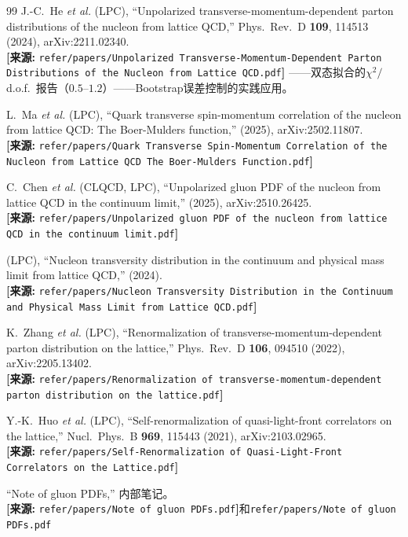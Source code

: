 \documentclass[12pt,a4paper]{ctexart}
\theoremstyle{definition}
\begin{document}
\begin{thebibliography}{99}
J.-C.~He \textit{et al.} (LPC),
``Unpolarized transverse-momentum-dependent parton distributions of the nucleon from lattice QCD,''
Phys.\ Rev.\ D \textbf{109}, 114513 (2024), arXiv:2211.02340.
\\\textbf{[来源:} \texttt{refer/papers/Unpolarized Transverse-Momentum-Dependent Parton Distributions of the Nucleon from Lattice QCD.pdf}\textbf{]}
——双态拟合的$\chi^2/$d.o.f.\ 报告（$0.5\text{--}1.2$）——Bootstrap误差控制的实践应用。

L.~Ma \textit{et al.} (LPC),
``Quark transverse spin-momentum correlation of the nucleon from lattice QCD: The Boer-Mulders function,''
(2025), arXiv:2502.11807.
\\\textbf{[来源:} \texttt{refer/papers/Quark Transverse Spin-Momentum Correlation of the Nucleon from Lattice QCD The Boer-Mulders Function.pdf}\textbf{]}

C.~Chen \textit{et al.} (CLQCD, LPC),
``Unpolarized gluon PDF of the nucleon from lattice QCD in the continuum limit,''
(2025), arXiv:2510.26425.
\\\textbf{[来源:} \texttt{refer/papers/Unpolarized gluon PDF of the nucleon from lattice QCD in the continuum limit.pdf}\textbf{]}

(LPC),
``Nucleon transversity distribution in the continuum and physical mass limit from lattice QCD,''
(2024).
\\\textbf{[来源:} \texttt{refer/papers/Nucleon Transversity Distribution in the Continuum and Physical Mass Limit from Lattice QCD.pdf}\textbf{]}

K.~Zhang \textit{et al.} (LPC),
``Renormalization of transverse-momentum-dependent parton distribution on the lattice,''
Phys.\ Rev.\ D \textbf{106}, 094510 (2022), arXiv:2205.13402.
\\\textbf{[来源:} \texttt{refer/papers/Renormalization of transverse-momentum-dependent parton distribution on the lattice.pdf}\textbf{]}

Y.-K.~Huo \textit{et al.} (LPC),
``Self-renormalization of quasi-light-front correlators on the lattice,''
Nucl.\ Phys.\ B \textbf{969}, 115443 (2021), arXiv:2103.02965.
\\\textbf{[来源:} \texttt{refer/papers/Self-Renormalization of Quasi-Light-Front Correlators on the Lattice.pdf}\textbf{]}

``Note of gluon PDFs,'' 内部笔记。
\\\textbf{[来源:} \texttt{refer/papers/Note of gluon PDFs.pdf}\textbf{]}和\texttt{refer/papers/Note of gluon PDFs.pdf}

\end{thebibliography}
\end{document}
